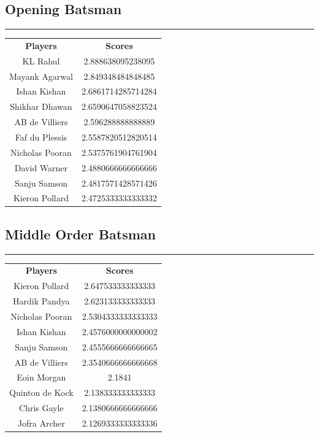 \documentclass[12pt]{article}
\begin{document}
\begin{minipage}{240pt}
	\subsection*{Opening Batsman}
	\hrule
	\begin{tabular}{c | c}
		\textbf{Players} & \textbf{Scores}\\
		KL Rahul & 2.888638095238095 \\
		Mayank Agarwal & 2.849348484848485 \\
		Ishan Kishan & 2.6861714285714284 \\
		Shikhar Dhawan & 2.6590647058823524 \\
		AB de Villiers & 2.596288888888889 \\
		Faf du Plessis & 2.5587820512820514 \\
		Nicholas Pooran & 2.5375761904761904 \\
		David Warner & 2.4880666666666666 \\
		Sanju Samson & 2.4817571428571426 \\
		Kieron Pollard & 2.4725333333333332 \\
	\end{tabular}
\end{minipage}
\begin{minipage}{240pt}
	\subsection*{Middle Order Batsman}
	\hrule
	\begin{tabular}{c | c}
		\textbf{Players} & \textbf{Scores}\\
		Kieron Pollard & 2.647533333333333 \\
		Hardik Pandya & 2.623133333333333 \\
		Nicholas Pooran & 2.5304333333333333 \\
		Ishan Kishan & 2.4576000000000002 \\
		Sanju Samson & 2.4555666666666665 \\
		AB de Villiers & 2.3540666666666668 \\
		Eoin Morgan & 2.1841 \\
		Quinton de Kock & 2.138333333333333 \\
		Chris Gayle & 2.1380666666666666 \\
		Jofra Archer & 2.1269333333333336 \\
	\end{tabular}\\
\end{minipage}
\end{document}
